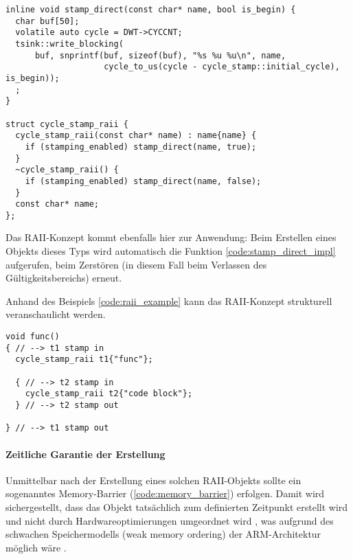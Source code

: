 \begin{code}
\begin{verbatim}
inline void stamp_direct(const char* name, bool is_begin) {
  char buf[50];
  volatile auto cycle = DWT->CYCCNT;
  tsink::write_blocking(
      buf, snprintf(buf, sizeof(buf), "%s %u %u\n", name,
                    cycle_to_us(cycle - cycle_stamp::initial_cycle), is_begin));
  ;
}

struct cycle_stamp_raii {
  cycle_stamp_raii(const char* name) : name{name} {
    if (stamping_enabled) stamp_direct(name, true);
  }
  ~cycle_stamp_raii() {
    if (stamping_enabled) stamp_direct(name, false);
  }
  const char* name;
};
\end{verbatim}
    \label{code:stamp_direct_impl}
\end{code}

Das RAII-Konzept kommt ebenfalls hier zur Anwendung: Beim Erstellen eines
Objekts dieses Typs wird automatisch die Funktion \ref{code:stamp_direct_impl}
aufgerufen, beim Zerstören (in diesem Fall beim Verlassen des
Gültigkeitsbereichs) erneut.

Anhand des Beispiels \ref{code:raii_example} kann das RAII-Konzept strukturell
veranschaulicht werden.

\begin{code}
\begin{verbatim}
void func()
{ // --> t1 stamp in
  cycle_stamp_raii t1{"func"};

  { // --> t2 stamp in
    cycle_stamp_raii t2{"code block"};
  } // --> t2 stamp out

} // --> t1 stamp out
\end{verbatim}
    \label{code:raii_example}
\end{code}

\paragraph{Zeitliche Garantie der Erstellung}

Unmittelbar nach der Erstellung eines solchen RAII-Objekts sollte ein
sogenanntes Memory-Barrier (\ref{code:memory_barrier}) erfolgen. Damit wird
sichergestellt, dass das Objekt tatsächlich zum definierten Zeitpunkt erstellt
wird und nicht durch Hardwareoptimierungen umgeordnet wird
\cite{arm_mem_barrier}, was aufgrund des schwachen Speichermodells (weak memory
ordering) der ARM-Architektur möglich wäre \cite[S. 5]{arm_sync_overview}.

